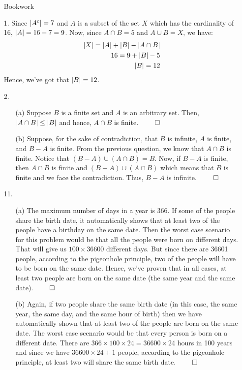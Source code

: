 \documentclass[12pt, a4paper]{article}
\DeclarePairedDelimiter\abs{\lvert}{\rvert}
\begin{document}
\begin{itemize}
\item[]
\item[]

{\Large Bookwork}
\item[1.]
Since $\abs{A^c} = 7$ and $A$ is a subset of the set $X$ which has the cardinality of 16, $\abs{A} = 16 - 7 = 9$.
Now, since $A \cap B = 5$ and $A \cup B = X$, we have:
\begin{align}
\abs{X}= \abs{A} + \abs{B} - \abs{A \cap B}\\
16 = 9 + \abs{B} - 5\\
\abs{B} = 12
\end{align}
Hence, we've got that $\abs{B} = 12$.

\item[]

\item[2.]
\begin{itemize}
\item[(a)]
Suppose $B$ is a finite set and $A$ is an arbitrary set.
Then, $\abs{A \cap B} \leq \abs{B}$ and hence, $A \cap B$ is finite.
$\qed$
\item[(b)]
Suppose, for the sake of contradiction, that $B$ is infinite, $A$ is finite, and $B - A$ is finite.
From the previous question, we know that $A \cap B$ is finite.
Notice that $(B - A) \cup (A \cap B) = B$. Now, if $B - A$ is finite,
then $A \cap B$ is finite and $(B - A) \cup (A \cap B)$ which means that
$B$ is finite and we face the contradiction. Thus, $B - A$ is infinite.
$\qed$
\end{itemize}

\item[]

\item[11.]
\begin{itemize}
\item[(a)]
The maximum number of days in a year is 366.
If some of the people share the birth date, it automatically shows that at least two of the people have a birthday on the same date.
Then the worst case scenario for this problem would be that all the people were born on different days. That will give us $100 \times 36600$
different days. But since there are 36601 people, according to the pigeonhole principle,
two of the people will have to be born on the same date. Hence, we've proven
that in all cases, at least two people are born on the same date (the same year and the same date).
$\qed$

\item[(b)]
Again, if two people share the same birth date (in this case, the same year, the same day, and the same hour of birth) then we have automatically shown that at least two of the people are born on the same date.
The worst case scenario would be that every person is born on a different date. There are $366 \times 100 \times 24 = 36600 \times 24$ hours in 100 years and since we have $36600 \times 24 + 1$ people, according
to the pigeonhole principle, at least two will share the same birth date.
$\qed$
\end{itemize}


\end{itemize}
\end{document}
